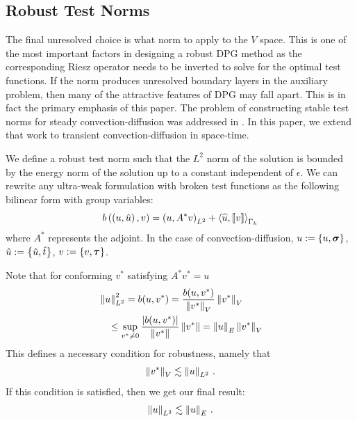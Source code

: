 \documentclass{article}
\begin{document}
\subsection{Robust Test Norms}
The final unresolved choice is what norm to apply to the $V$ space.
This is one of the most important factors in designing a robust DPG method as the corresponding Riesz operator 
needs to be inverted to solve for the optimal test functions.
If the norm produces unresolved boundary layers in the auxiliary problem, then many of the attractive features of DPG may fall apart.
This is in fact the primary emphasis of this paper.
The problem of constructing stable test norms for steady convection-diffusion was addressed in \cite{DemkowiczHeuer,ChanHeuerThanhDemkowicz2012}.
In this paper, we extend that work to transient convection-diffusion in space-time.

We define a robust test norm such that the $L^2$ norm of the solution 
is bounded by the energy norm of the solution up to a constant independent of $\epsilon$.
We can rewrite any ultra-weak formulation with broken test functions as the following
bilinear form with group variables:
\[
b\left( \left( u,\hat u \right),v \right) = \left( u,A^* v \right)_{L^2} + \left\langle \widehat{u}, \left[ \![v]\! \right] \right\rangle_{\Gamma_h}
\]
where $A^*$ represents the adjoint.
In the case of convection-diffusion, $u:=\left\{ u,\boldsymbol\sigma \right\}$, $\hat u:=\left\{ \hat u,\hat t \right\}$, $v:=\left\{ v,\boldsymbol\tau \right\}$.

Note that for conforming $v^*$ satisfying $A^* v^* = u$
\begin{align*}
&\left\| u \right\|_{L^2}^2= b(u,v^*)
=\frac{b(u,v^*)}{\left\| v^* \right\|_V} \left\| v^* \right\|_V\\
&\quad\leq\sup_{v^*\neq0}\frac{|b(u,v^*)|}{\left\| v^* \right\|}\left\| v^* \right\|
=\left\| u \right\|_E \left\| v^* \right\|_V
\end{align*}
This defines a necessary condition for robustness, namely that
\begin{align}
\label{eq:necessaryCondition}
\left\| v^* \right\|_V\lesssim\left\| u \right\|_{L^2}\,.
\end{align}
If this condition is satisfied, then we get our final result:
\begin{align*}
\left\| u \right\|_{L^2}\lesssim\left\| u \right\|_E\,.
\end{align*}
\end{document}

